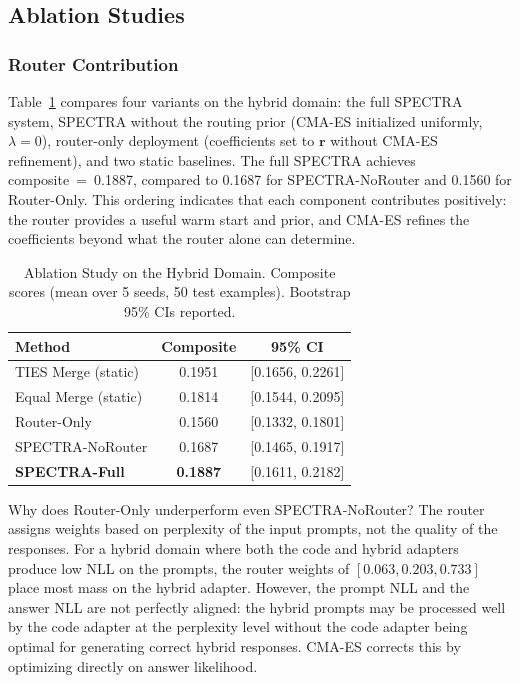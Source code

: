 \documentclass[preprint,12pt]{elsarticle}
\begin{document}
\subsection{Ablation Studies}
\label{subsec:ablation}

\subsubsection{Router Contribution}

Table~\ref{tab:ablation} compares four variants on the hybrid domain: the full
SPECTRA system, SPECTRA without the routing prior (CMA-ES initialized uniformly,
$\lambda = 0$), router-only deployment (coefficients set to $\mathbf{r}$ without
CMA-ES refinement), and two static baselines. The full SPECTRA achieves
composite~=~0.1887, compared to 0.1687 for SPECTRA-NoRouter and 0.1560 for
Router-Only. This ordering indicates that each component contributes positively:
the router provides a useful warm start and prior, and CMA-ES refines the
coefficients beyond what the router alone can determine.

\begin{table}[t]
\centering
\caption{Ablation Study on the Hybrid Domain. Composite scores (mean over 5 seeds, 50 test examples). Bootstrap 95\% CIs reported.}
\label{tab:ablation}
\begin{tabular}{lcc}
\toprule
\textbf{Method} & \textbf{Composite} & \textbf{95\% CI} \\
\midrule
TIES Merge (static)      & 0.1951 & [0.1656, 0.2261] \\
Equal Merge (static)     & 0.1814 & [0.1544, 0.2095] \\
\midrule
Router-Only              & 0.1560 & [0.1332, 0.1801] \\
SPECTRA-NoRouter         & 0.1687 & [0.1465, 0.1917] \\
\textbf{SPECTRA-Full}    & \textbf{0.1887} & [0.1611, 0.2182] \\
\bottomrule
\end{tabular}
\end{table}

Why does Router-Only underperform even SPECTRA-NoRouter? The router assigns
weights based on perplexity of the input prompts, not the quality of the
responses. For a hybrid domain where both the code and hybrid adapters produce
low NLL on the prompts, the router weights of $[0.063, 0.203, 0.733]$ place
most mass on the hybrid adapter. However, the prompt NLL and the answer NLL
are not perfectly aligned: the hybrid prompts may be processed well by the code
adapter at the perplexity level without the code adapter being optimal for
generating correct hybrid responses. CMA-ES corrects this by optimizing directly
on answer likelihood.
\end{document}
